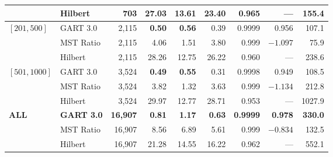 \begin{table}[!ht]
{\begin{tabular}{@{}ll rrrrrrr@{}}
                              & Hilbert   & 703 & 27.03 & 13.61 & 23.40 & 0.965 & --- & 155.4 \\ \midrule
\multirow{3}{*}{$[201,500]$}  & GART 3.0  & 2{,}115 & \textbf{0.50} & \textbf{0.56} & 0.39 & 0.9999 & 0.956 & 107.1 \\
                              & MST Ratio & 2{,}115 & 4.06 & 1.51 & 3.80 & 0.999 & $-1.097$ & 75.9 \\
                              & Hilbert   & 2{,}115 & 28.26 & 12.75 & 26.22 & 0.960 & --- & 238.6 \\ \midrule
\multirow{3}{*}{$[501,1000]$} & GART 3.0  & 3{,}524 & \textbf{0.49} & \textbf{0.55} & 0.31 & 0.9998 & 0.949 & 108.5 \\
                              & MST Ratio & 3{,}524 & 3.82 & 1.32 & 3.63 & 0.999 & $-1.134$ & 212.8 \\
                              & Hilbert   & 3{,}524 & 29.97 & 12.77 & 28.71 & 0.953 & --- & 1027.9 \\ \midrule
\multirow{3}{*}{\textbf{ALL}} & \textbf{GART 3.0}  & \textbf{16{,}907} & \textbf{0.81} & \textbf{1.17} & \textbf{0.63} & \textbf{0.9999} & \textbf{0.978} & \textbf{330.0} \\
                              & MST Ratio & 16{,}907 & 8.56 & 6.89 & 5.61 & 0.999 & $-0.834$ & 132.5 \\
                              & Hilbert   & 16{,}907 & 21.28 & 14.55 & 16.22 & 0.962 & --- & 552.1 \\
\bottomrule
\end{tabular}%
}
\end{table}

